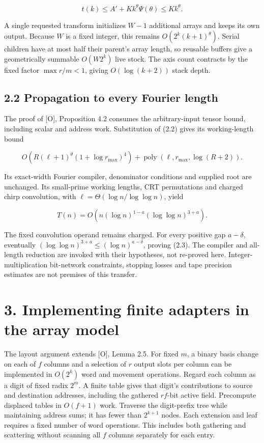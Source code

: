 \documentclass[
  11pt,
]{article}
\begin{document}
\[
t(k)\le A'+K k^\theta\Psi(\theta)\le K k^\theta.
\]

A single requested transform initializes \(W-1\) additional arrays and
keeps its own output. Because \(W\) is a fixed integer, this remains
\(O(2^k(k+1)^\theta)\). Serial children have at most half their parent's
array length, so reusable buffers give a geometrically summable
\(O(W2^k)\) live stock. The axis count contracts by the fixed factor
\(\max r/m<1\), giving \(O(\log(k+2))\) stack depth.

\subsection{2.2 Propagation to every Fourier
length}\label{propagation-to-every-fourier-length}

The proof of {[}O{]}, Proposition 4.2 consumes the arbitrary-input
tensor bound, including scalar and address work. Substitution of (2.2)
gives its working-length bound

\[
O\!\left(R(\ell+1)^\theta(1+\log r_{\max})^4\right)
+\operatorname{poly}(\ell,r_{\max},\log(R+2)).
\]

Its exact-width Fourier compiler, denominator conditions and supplied
root are unchanged. Its small-prime working lengths, CRT permutations
and charged chirp convolution, with \(\ell=\Theta(\log n/\log\log n)\),
yield

\[
T(n)=O\!\left(n(\log n)^{1-a}(\log\log n)^{3+a}\right).
\tag{2.6}
\]

The fixed convolution operand remains charged. For every positive gap
\(a-\delta\), eventually \((\log\log n)^{3+a}\le(\log n)^{a-\delta}\),
proving (2.3). The compiler and all-length reduction are invoked with
their hypotheses, not re-proved here. Integer-multiplication bit-network
constraints, stopping losses and tape precision estimates are not
premises of this transfer.

\section{3. Implementing finite adapters in the array
model}\label{implementing-finite-adapters-in-the-array-model}

The layout argument extends {[}O{]}, Lemma 2.5. For fixed \(m\), a
binary basis change on each of \(f\) columns and a selection of \(r\)
output slots per column can be implemented in \(O(2^k)\) word and
movement operations. Regard each column as a digit of fixed radix
\(2^m\). A finite table gives that digit's contributions to source and
destination addresses, including the gathered \(rf\)-bit active field.
Precompute displaced tables in \(O(f+1)\) work. Traverse the
digit-prefix tree while maintaining address sums; it has fewer than
\(2^{k+1}\) nodes. Each extension and leaf requires a fixed number of
word operations. This includes both gathering and scattering without
scanning all \(f\) columns separately for each entry.
\end{document}
